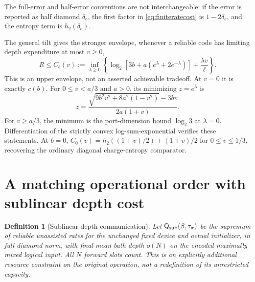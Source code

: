 \documentclass[11pt]{article}
\newtheorem{definition}[theorem]{Definition}
\newcommand{\Qcap}{\mathsf Q}
\begin{document}
The full-error and half-error conventions are not interchangeable:
if the error is reported as half diamond \(\delta_e\), the first factor
in \eqref{eq:finiteratecost} is \(1-2\delta_e\), and the entropy term is
\(h_2(\delta_e)\).

The general tilt gives the stronger envelope, whenever a reliable code
has limiting depth expenditure at most \(v\ge0\),
\begin{equation}\label{eq:costcurve}
 R\le C_b(v):=\inf_{\lambda\ge0}
 \left\{\log_2[3b+a(e^\lambda+2e^{-\lambda})]
             +\frac{\lambda v}{\ell}\right\}.
\end{equation}
This is an upper envelope, not an asserted achievable tradeoff.
At \(v=0\) it is exactly \(c(b)\).
For \(0\le v<a/3\) and \(a>0\), its minimizing \(z=e^\lambda\) is
\[
 z=\frac{\sqrt{9b^2v^2+8a^2(1-v^2)}-3bv}{2a(1+v)}.
\]
For \(v\ge a/3\), the minimum is the port-dimension bound \(\log_2 3\)
at \(\lambda=0\). Differentiation of the strictly convex
log-sum-exponential verifies these statements. At \(b=0\),
\(C_0(v)=h_2((1+v)/2)+(1+v)/2\) for \(0\le v\le1/3\),
recovering the ordinary diagonal charge-entropy comparator.

\section{A matching operational order with sublinear depth cost}

\begin{definition}[Sublinear-depth communication]
Let \(\Qcap_{\rm sub}(\beta,\tau_\pi)\) be the supremum of reliable
unassisted rates for the unchanged fixed device and actual initializer,
in full diamond norm, with final mean bath depth \(o(N)\) on the encoded
maximally mixed logical input. All \(N\) forward slots count.
This is an explicitly additional resource constraint on the original
operation, not a redefinition of its unrestricted capacity.
\end{definition}
\end{document}

